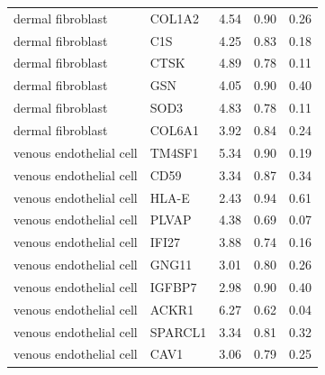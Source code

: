 \begin{longtable}{llccc}
dermal fibroblast & COL1A2 & 4.54 & 0.90 & 0.26 \\
dermal fibroblast & C1S & 4.25 & 0.83 & 0.18 \\
dermal fibroblast & CTSK & 4.89 & 0.78 & 0.11 \\
dermal fibroblast & GSN & 4.05 & 0.90 & 0.40 \\
dermal fibroblast & SOD3 & 4.83 & 0.78 & 0.11 \\
dermal fibroblast & COL6A1 & 3.92 & 0.84 & 0.24 \\
venous endothelial cell & TM4SF1 & 5.34 & 0.90 & 0.19 \\
venous endothelial cell & CD59 & 3.34 & 0.87 & 0.34 \\
venous endothelial cell & HLA-E & 2.43 & 0.94 & 0.61 \\
venous endothelial cell & PLVAP & 4.38 & 0.69 & 0.07 \\
venous endothelial cell & IFI27 & 3.88 & 0.74 & 0.16 \\
venous endothelial cell & GNG11 & 3.01 & 0.80 & 0.26 \\
venous endothelial cell & IGFBP7 & 2.98 & 0.90 & 0.40 \\
venous endothelial cell & ACKR1 & 6.27 & 0.62 & 0.04 \\
venous endothelial cell & SPARCL1 & 3.34 & 0.81 & 0.32 \\
venous endothelial cell & CAV1 & 3.06 & 0.79 & 0.25 \\
\end{longtable}
